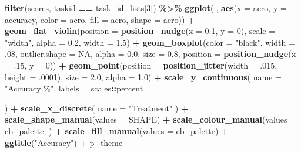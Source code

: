 \documentclass[
]{book}
\newenvironment{Shaded}{\begin{snugshade}}{\end{snugshade}}
\newcommand{\AttributeTok}[1]{\textcolor[rgb]{0.13,0.29,0.53}{#1}}
\newcommand{\ConstantTok}[1]{\textcolor[rgb]{0.56,0.35,0.01}{#1}}
\newcommand{\DecValTok}[1]{\textcolor[rgb]{0.00,0.00,0.81}{#1}}
\newcommand{\FloatTok}[1]{\textcolor[rgb]{0.00,0.00,0.81}{#1}}
\newcommand{\FunctionTok}[1]{\textcolor[rgb]{0.13,0.29,0.53}{\textbf{#1}}}
\newcommand{\NormalTok}[1]{#1}
\newcommand{\SpecialCharTok}[1]{\textcolor[rgb]{0.81,0.36,0.00}{\textbf{#1}}}
\newcommand{\StringTok}[1]{\textcolor[rgb]{0.31,0.60,0.02}{#1}}
\begin{document}
\begin{Shaded}
\begin{Highlighting}[]
\FunctionTok{filter}\NormalTok{(scores, taskid }\SpecialCharTok{==}\NormalTok{ task\_id\_lists[}\DecValTok{3}\NormalTok{]) }\SpecialCharTok{\%\textgreater{}\%}
  \FunctionTok{ggplot}\NormalTok{(., }\FunctionTok{aes}\NormalTok{(}\AttributeTok{x =}\NormalTok{ acro, }\AttributeTok{y =}\NormalTok{ accuracy, }\AttributeTok{color =}\NormalTok{ acro,}
                \AttributeTok{fill =}\NormalTok{ acro, }\AttributeTok{shape =}\NormalTok{ acro)) }\SpecialCharTok{+}
  \FunctionTok{geom\_flat\_violin}\NormalTok{(}\AttributeTok{position =} \FunctionTok{position\_nudge}\NormalTok{(}\AttributeTok{x =} \FloatTok{0.1}\NormalTok{, }\AttributeTok{y =} \DecValTok{0}\NormalTok{),}
                   \AttributeTok{scale =} \StringTok{"width"}\NormalTok{, }\AttributeTok{alpha =} \FloatTok{0.2}\NormalTok{, }\AttributeTok{width =} \FloatTok{1.5}\NormalTok{) }\SpecialCharTok{+}
  \FunctionTok{geom\_boxplot}\NormalTok{(}\AttributeTok{color =} \StringTok{"black"}\NormalTok{, }\AttributeTok{width =}\NormalTok{ .}\DecValTok{08}\NormalTok{, }\AttributeTok{outlier.shape =} \ConstantTok{NA}\NormalTok{, }\AttributeTok{alpha =} \FloatTok{0.0}\NormalTok{,}
               \AttributeTok{size =} \FloatTok{0.8}\NormalTok{, }\AttributeTok{position =} \FunctionTok{position\_nudge}\NormalTok{(}\AttributeTok{x =}\NormalTok{ .}\DecValTok{15}\NormalTok{, }\AttributeTok{y =} \DecValTok{0}\NormalTok{)) }\SpecialCharTok{+}
  \FunctionTok{geom\_point}\NormalTok{(}\AttributeTok{position =} \FunctionTok{position\_jitter}\NormalTok{(}\AttributeTok{width =}\NormalTok{ .}\DecValTok{015}\NormalTok{, }\AttributeTok{height =}\NormalTok{ .}\DecValTok{0001}\NormalTok{),}
             \AttributeTok{size =} \FloatTok{2.0}\NormalTok{, }\AttributeTok{alpha =} \FloatTok{1.0}\NormalTok{) }\SpecialCharTok{+}
  \FunctionTok{scale\_y\_continuous}\NormalTok{(}
    \AttributeTok{name =} \StringTok{"Accuracy \%"}\NormalTok{,}
    \AttributeTok{labels =}\NormalTok{ scales}\SpecialCharTok{::}\NormalTok{percent}

\NormalTok{  ) }\SpecialCharTok{+}
  \FunctionTok{scale\_x\_discrete}\NormalTok{(}
    \AttributeTok{name =} \StringTok{"Treatment"}
\NormalTok{  ) }\SpecialCharTok{+}
  \FunctionTok{scale\_shape\_manual}\NormalTok{(}\AttributeTok{values =}\NormalTok{ SHAPE) }\SpecialCharTok{+}
  \FunctionTok{scale\_colour\_manual}\NormalTok{(}\AttributeTok{values =}\NormalTok{ cb\_palette, ) }\SpecialCharTok{+}
  \FunctionTok{scale\_fill\_manual}\NormalTok{(}\AttributeTok{values =}\NormalTok{ cb\_palette) }\SpecialCharTok{+}
  \FunctionTok{ggtitle}\NormalTok{(}\StringTok{"Accuracy"}\NormalTok{) }\SpecialCharTok{+}
\NormalTok{  p\_theme}
\end{Highlighting}
\end{Shaded}
\end{document}
